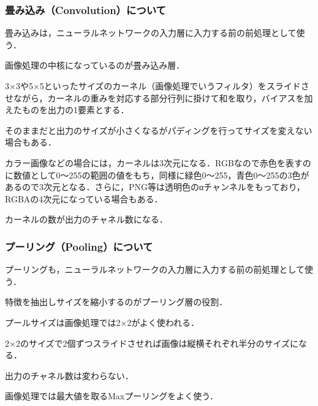 \documentclass[uplatex,titlepage]{jsarticle}
\newif\iffigure
\begin{document}
\subsubsection{畳み込み（Convolution）について}
畳み込みは，ニューラルネットワークの入力層に入力する前の前処理として使う．
\iffigure
\begin{figure}[H]%
    \begin{center}
    \texttt{[image: convolution\_model.png]} 
    \caption{畳み込みのイメージ}
    \end{center}
\end{figure}
\fi
画像処理の中核になっているのが畳み込み層．\par
3×3や5×5といったサイズのカーネル（画像処理でいうフィルタ）をスライドさせながら，カーネルの重みを対応する部分行列に掛けて和を取り，バイアスを加えたものを出力の1要素とする．\par
そのままだと出力のサイズが小さくなるがパディングを行ってサイズを変えない場合もある．\par
カラー画像などの場合には，カーネルは3次元になる．RGBなので赤色を表すのに数値として0～255の範囲の値をもち，同様に緑色0～255，青色0～255の3色があるので3次元となる．さらに，PNG等は透明色のαチャンネルをもっており，RGBAの4次元になっている場合もある．\par
カーネルの数が出力のチャネル数になる．

\subsubsection{プーリング（Pooling）について}
プーリングも，ニューラルネットワークの入力層に入力する前の前処理として使う．
\iffigure
\begin{figure}[H]%
    \begin{center}
    \texttt{[image: pooling\_model.png]} 
    \caption{プーリングのイメージ}
    \end{center}
\end{figure}
\fi
特徴を抽出しサイズを縮小するのがプーリング層の役割．\par
プールサイズは画像処理では2×2がよく使われる．\par
2×2のサイズで2個ずつスライドさせれば画像は縦横それぞれ半分のサイズになる．\par
出力のチャネル数は変わらない．\par
画像処理では最大値を取るMaxプーリングをよく使う．
\end{document}
